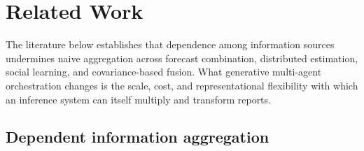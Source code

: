 \documentclass[11pt]{article}
\theoremstyle{definition}
\begin{document}
\section{Related Work}
\label{sec:related-work}

The literature below establishes that dependence among information sources undermines naive aggregation across forecast combination, distributed estimation, social learning, and covariance-based fusion. What generative multi-agent orchestration changes is the scale, cost, and representational flexibility with which an inference system can itself multiply and transform reports.

\subsection{Dependent information aggregation}
\end{document}
